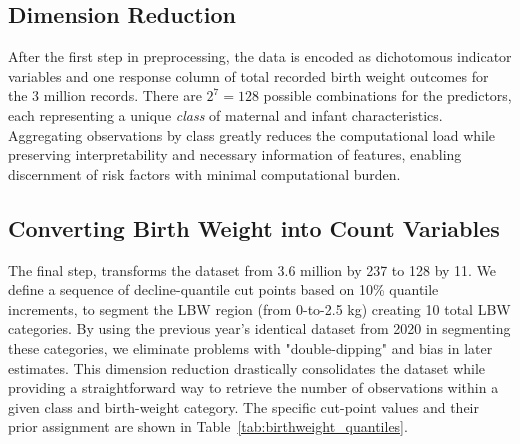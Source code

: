 \subsection{Dimension Reduction}
\label{sec:ch2-dimension-reduction}

After the first step in preprocessing, the data is encoded as dichotomous indicator variables and one response column of total recorded birth weight outcomes for the 3 million records. There are \(2^7 = 128\) possible combinations for the predictors, each representing a unique \emph{class} of maternal and infant characteristics. Aggregating observations by class greatly reduces the computational load while preserving interpretability and necessary information of features, enabling discernment of risk factors with minimal computational burden.

\subsection{Converting Birth Weight into Count Variables} 
\label{sec:ch2-count-variables}

The final step, transforms the dataset from 3.6 million by 237 to 128 by 11. We define a sequence of decline-quantile cut points based on 10\% quantile increments, to segment the LBW region (from 0-to-2.5 kg) creating 10 total LBW categories. By using the previous year's identical dataset from 2020 in segmenting these categories, we eliminate problems with "double-dipping" and bias in later estimates. This dimension reduction drastically consolidates the dataset while providing a straightforward way to retrieve the number of observations within a given class and birth-weight category. The specific cut-point values and their prior assignment are shown in Table~\ref{tab:birthweight_quantiles}.

